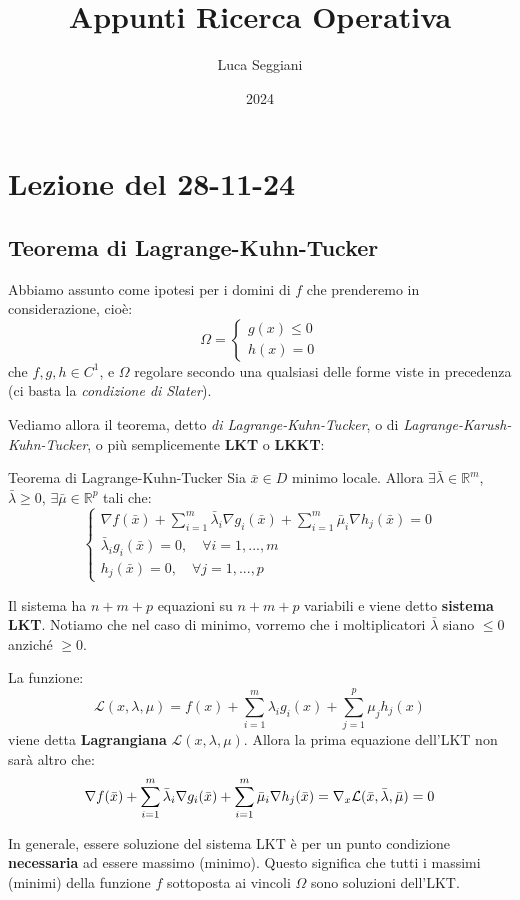 \documentclass[a4paper,11pt]{article}
\title{Appunti Ricerca Operativa}
\author{Luca Seggiani}
\date{2024}
\begin{document}
\section{Lezione del 28-11-24}

\thispagestyle{empty}
\pagestyle{fancy}

\subsection{Teorema di Lagrange-Kuhn-Tucker}
Abbiamo assunto come ipotesi per i domini di $f$ che prenderemo in considerazione, cioè:
$$
\Omega = 
	\begin{cases}
		g(x) \leq 0 \\ 
		h(x) = 0
	\end{cases}
$$
che $f, g, h \in C^1$, e $\Omega$ regolare secondo una qualsiasi delle forme viste in precedenza (ci basta la \textit{condizione di Slater}).

Vediamo allora il teorema, detto \textit{di Lagrange-Kuhn-Tucker}, o di \textit{Lagrange-Karush-Kuhn-Tucker}, o più semplicemente \textbf{LKT} o \textbf{LKKT}:
\begin{theorem}{Teorema di Lagrange-Kuhn-Tucker}
	Sia $\bar{x} \in D$ minimo locale.
	Allora $\exists \bar{\lambda} \in \mathbb{R}^m$, $\bar{\lambda} \geq 0$, $\exists \bar{\mu} \in \mathbb{R}^p$ tali che:
	\[
		\begin{cases}
			\nabla f(\bar{x}) + \sum\limits_{i=1}^m \bar{\lambda}_i \nabla g_i(\bar{x}) + \sum\limits_{i=1}^m \bar{\mu}_i \nabla h_j(\bar{x}) = 0 \\ 
			\bar{\lambda}_i g_i(\bar{x}) = 0, \quad \forall i = 1, ..., m \\ 
			h_j(\bar{x}) = 0, \quad \forall j = 1, ..., p	
		\end{cases}
	\]
\end{theorem}
Il sistema ha $n + m + p$ equazioni su $n + m + p$ variabili e viene detto \textbf{sistema LKT}.
Notiamo che nel caso di minimo, vorremo che i moltiplicatori $\bar{\lambda}$ siano $\leq 0$ anziché $\geq 0$.

La funzione:
$$
\mathcal{L}(x, \lambda, \mu) = f(x) + \sum\limits_{i=1}^m \lambda_i g_i(x) + \sum\limits_{j=1}^p \mu_j h_j(x)
$$
viene detta \textbf{Lagrangiana} $\mathcal{L}(x, \lambda, \mu)$.
Allora la prima equazione dell'LKT non sarà altro che:
$$
\nabla f(\bar{x}) + \sum\limits_{i=1}^m \bar{\lambda}_i \nabla g_i(\bar{x}) + \sum\limits_{i=1}^m \bar{\mu}_i \nabla h_j(\bar{x}) = \nabla_x \mathcal{L}(\bar{x}, \bar{\lambda}, \bar{\mu}) = 0 \\ 
$$

In generale, essere soluzione del sistema LKT è per un punto condizione \textbf{necessaria} ad essere massimo (minimo).
Questo significa che tutti i massimi (minimi) della funzione $f$ sottoposta ai vincoli $\Omega$ sono soluzioni dell'LKT.
\end{document}

